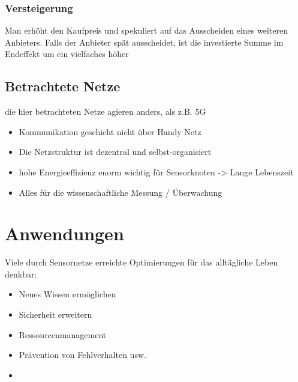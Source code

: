 \documentclass[a4paper]{article}
\begin{document}
\subsubsection{Versteigerung}
Man erhöht den Kaufpreis und spekuliert auf das Ausscheiden eines weiteren Anbieters. Falls der Anbieter spät ausscheidet, ist die investierte Summe im Endeffekt um ein vielfaches höher
\subsection{Betrachtete Netze}
die hier betrachteten Netze agieren anders, als z.B. 5G
\begin{itemize}
	\item Kommunikation geschieht nicht über Handy Netz
	\item Die Netzstruktur ist dezentral und selbst-organisiert
	\item hohe Energieeffizienz enorm wichtig für Sensorknoten -> Lange Lebenszeit
	\item Alles für die wissenschaftliche Messung / Überwachung
\end{itemize}
\newpage
\section{Anwendungen}
Viele durch Sensornetze erreichte Optimierungen für das alltägliche Leben denkbar:
\begin{itemize}
	\item Neues Wissen ermöglichen
	\item Sicherheit erweitern
	\item Ressourcenmanagement
	\item Prävention von Fehlverhalten usw.
	\item[]
\end{itemize}
\end{document}
